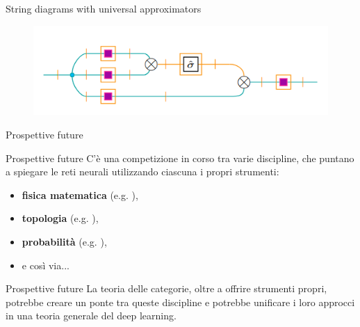 \documentclass{beamer}
\begin{document}
\begin{frame}{String diagrams with universal approximators}
    \begin{figure}
        \begin{center}
            \includegraphics[width=1\textwidth]{figures/khatri_attention.png}
            \caption*{\cite{khatri2024anatomy}}
        \end{center}
    \end{figure}
\end{frame}

\begin{frame}[standout]
    \huge Prospettive future
\end{frame}

\begin{frame}{Prospettive future}
    C'è una competizione in corso tra varie discipline, che puntano a spiegare le reti neurali utilizzando ciascuna i propri strumenti:
    \begin{itemize}
        \item<1-> \textbf{fisica matematica} {\footnotesize (e.g. \cite{roberts2022principles})},
        \item<2-> \textbf{topologia} {\footnotesize (e.g. \cite{hensel2021survey})},
        \item<3-> \textbf{probabilità} {\footnotesize (e.g. \cite{patel2015probabilistic})},
        \item<4-> e così via...
    \end{itemize}
    
\end{frame}

\begin{frame}{Prospettive future}
    La teoria delle categorie, oltre a offrire strumenti propri, potrebbe creare un ponte tra queste discipline e potrebbe unificare i loro approcci in una teoria generale del deep learning.
\end{frame}

\begin{frame}[allowframebreaks]
    \printbibliography
\end{frame}
\end{document}
